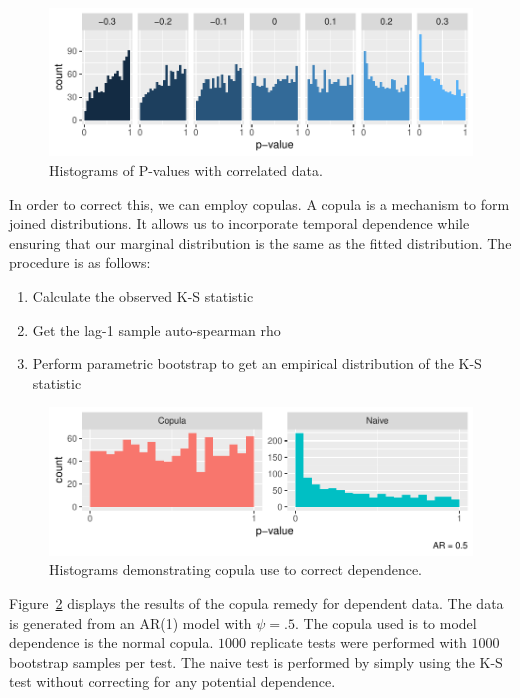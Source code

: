 \documentclass[12pt, letterpaper, titlepage]{article}
\begin{document}
\begin{figure}[tbp]
  \centering
  \includegraphics{hist_correlation}
  \caption{Histograms of P-values with correlated data.}
  \label{fig:hist_correlation}
\end{figure}

In order to correct this, we can employ copulas. A copula is a mechanism to form 
joined distributions. It allows us to incorporate temporal dependence while ensuring that our
marginal distribution is the same as the fitted distribution. The procedure is as follows:

\begin{enumerate}
  \item Calculate the observed K-S statistic
  \item Get the lag-1 sample auto-spearman rho
  \item Perform parametric bootstrap to get an empirical distribution of the K-S statistic
\end{enumerate}

\begin{figure}[tbp]
  \centering
  \includegraphics{hist_copula_only}
  \caption{Histograms demonstrating copula use to correct dependence.}
  \label{fig:hist_copula_only}
\end{figure}

Figure~\ref{fig:hist_copula_only} displays the results of the copula remedy for dependent data.
The data is generated from an AR(1) model with $\psi = .5$. The copula used is to model
dependence is the normal copula. $1000$ replicate tests were performed with $1000$ bootstrap samples per test.
The naive test is performed by simply using the K-S test without correcting for any 
potential dependence.
\end{document}
